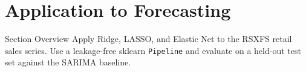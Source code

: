 \documentclass[aspectratio=169, 10pt]{beamer}
\begin{document}
\section{Application to Forecasting}


\begin{frame}{Section Overview}
  Apply Ridge, LASSO, and Elastic Net to the RSXFS retail sales series.
  Use a leakage-free sklearn \texttt{Pipeline} and evaluate on a held-out
  test set against the SARIMA baseline.
\end{frame}
\end{document}
